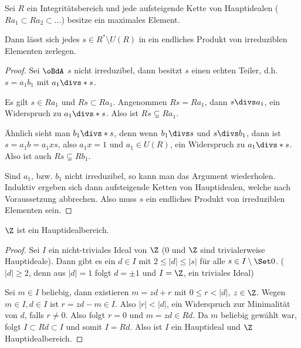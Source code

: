 \begin{lem} \label{1.8}
	Sei $R$ ein Integritätsbereich und jede aufsteigende Kette von Hauptidealen ($Ra_1 \subset Ra_2 \subset \dotsc$) besitze ein maximales Element.

	Dann lässt sich jedes $s \in R^* \setminus U(R)$ in ein endliches Produkt von irreduziblen Elementen zerlegen.
	\begin{proof}
		Sei $\oBdA$ $s$ nicht irreduzibel, dann besitzt $s$ einen echten Teiler, d.h. $s = a_1 b_1$ mit $a_1 \divs*  s$.

		Es gilt $s \in Ra_1$ und $Rs \subset Ra_1$.
		Angenommen $Rs = Ra_1$, dann $s \divs  a_1$, ein Widerspruch zu $a_1 \divs*  s$.
		Also ist $Rs \subsetneq Ra_1$.

		Ähnlich sieht man $b_1 \divs*  s$, denn wenn $b_1 \divs  s$ und $s \divs  b_1$, dann ist $s = a_1 b = a_1 x s$, also $a_1 x = 1$ und $a_1 \in U(R)$, ein Widerspruch zu $a_1 \divs* s$.
		Also ist auch $Rs \subsetneq Rb_1$.

		Sind $a_1$, bzw. $b_1$ nicht irreduzibel, so kann man das Argument wiederholen.
		Induktiv ergeben sich dann aufsteigende Ketten von Hauptidealen, welche nach Voraussetzung abbrechen.
		Also muss $s$ ein endliches Produkt von irreduziblen Elementen sein.
	\end{proof}
\end{lem}

\begin{lem} \label{1.9}
	$\Z$ ist ein Hauptidealbereich.
	\begin{proof}
		Sei $I$ ein nicht-triviales Ideal von $\Z$ ($0$ und $\Z$ sind trivialerweise Hauptideale).
		Dann gibt es ein $d \in I$ mit $2 \le |d| \le |s|$ für alle $s \in I \setminus \Set 0$.
		($|d| \ge 2$, denn aus $|d|=1$ folgt $d = \pm 1$ und $I = \Z$, ein triviales Ideal)

		Sei $m \in I$ beliebig, dann existieren $m = zd + r$ mit $0 \le r < |d|$, $z \in \Z$.
		Wegen $m \in I, d\in I$ ist $r = zd - m \in I$.
		Also $|r| < |d|$, ein Widerspruch zur Minimalität von $d$, falls $r \neq 0$.
		Also folgt $r = 0$ und $m = zd \in Rd$.
		Da $m$ beliebig gewählt war, folgt $I \subset Rd \subset I$ und somit $I = Rd$.
		Also ist $I$ ein Hauptideal und $\Z$ Hauptidealbereich.
	\end{proof}
\end{lem}

